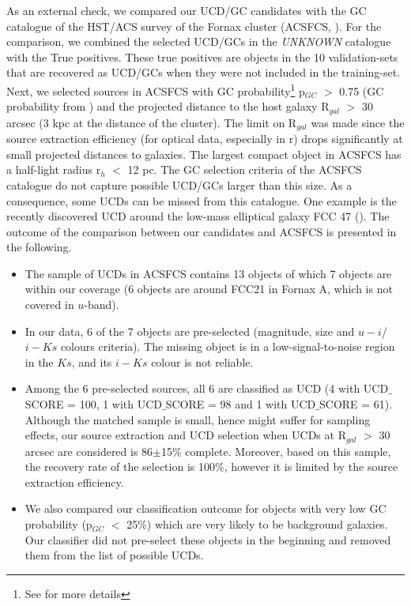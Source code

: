\documentclass[fleqn,usenatbib]{mnras}
\begin{document}
As an external check, we compared our UCD/GC candidates with the GC catalogue of the HST/ACS survey of the Fornax cluster (ACSFCS, \citealp{jordan2015}). For the comparison, we combined the selected UCD/GCs in the \textit{UNKNOWN} catalogue with the True positives. These true positives are objects in the 10 validation-sets that are recovered as UCD/GCs when they were not included in the training-set. Next, we selected sources in ACSFCS with GC probability\footnote{See \citet{jordan2009} for more details} p$_{GC}$ $>$ 0.75 (GC probability from \citealp{jordan2015}) and the projected distance to the host galaxy R$_{gal}$ $>$ 30 arcsec (3 kpc at the distance of the cluster). The limit on R$_{gal}$ was made since the source extraction efficiency (for optical data, especially in r) drops significantly at small projected distances to galaxies. The largest compact object in ACSFCS has a half-light radius r$_h$ $<$ 12 pc. The GC selection criteria of the ACSFCS catalogue do not capture possible UCD/GCs larger than this size. As a consequence, some UCDs can be missed from this catalogue. One example is the recently discovered UCD around the low-mass elliptical galaxy FCC 47 (\citealp{fahrion1}). The outcome of the comparison between our candidates and ACSFCS is presented in the following.

\begin{itemize}
\item The sample of UCDs in ACSFCS contains 13 objects of which 7 objects are within our coverage (6 objects are around FCC21 in Fornax A, which is not covered in $u$-band). \\

\item In our data, 6 of the 7 objects are pre-selected (magnitude, size and $u-i$/$i-Ks$ colours criteria). The missing object is in a low-signal-to-noise region in the $Ks$, and its $i-Ks$ colour is not reliable. \\

\item Among the 6 pre-selected sources, all 6 are classified as UCD (4 with UCD$\_$SCORE = 100, 1 with UCD$\_$SCORE = 98 and 1 with UCD$\_$SCORE = 61). Although the matched sample is small, hence might suffer for sampling effects, our source extraction and UCD selection when UCDs at R$_{gal}$ $>$ 30 arcsec are considered is 86$\pm$15\% complete. Moreover, based on this sample, the recovery rate of the selection is 100\%, however it is limited by the source extraction efficiency. \\

\item We also compared our classification outcome for objects with very low GC probability (p$_{GC}$ $<$ 25\%) which are very likely to be background galaxies. Our classifier did not pre-select these objects in the beginning and removed them from the list of possible UCDs. 
\end{itemize}
\end{document}
